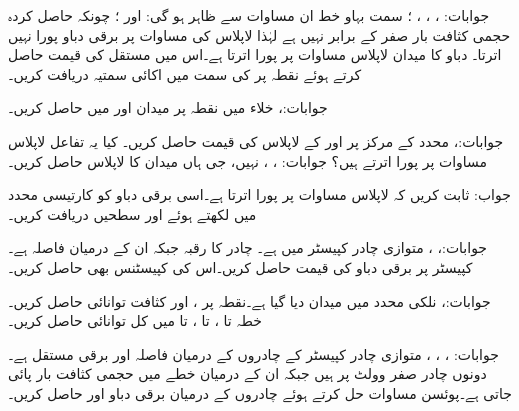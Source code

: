 جوابات: ، ،
 ، ؛ سمت بہاو خط ان مساوات سے ظاہر ہو گی:  اور ؛ چونکہ حاصل کردہ حجمی کثافت بار صفر کے برابر نہیں ہے لہٰذا لاپلاس کی مساوات پر برقی دباو پورا نہیں اترتا۔
دباو کا میدان  لاپلاس مساوات پر پورا اترتا ہے۔اس میں مستقل  کی قیمت حاصل کرتے ہوئے نقطہ  پر  کی سمت میں اکائی سمتیہ دریافت کریں۔

جوابات:، 
خلاء میں نقطہ  پر میدان  اور  میں  حاصل کریں۔

جوابات:، 
محدد کے مرکز  پر   اور  کے لاپلاس کی قیمت حاصل کریں۔ کیا یہ تفاعل لاپلاس مساوات پر پورا اترتے ہیں؟
جوابات: ، ، نہیں، جی ہاں
میدان  کا لاپلاس حاصل کریں۔

جواب: 
ثابت کریں کہ  لاپلاس مساوات پر پورا اترتا ہے۔اسی برقی دباو کو کارتیسی محدد میں لکھتے ہوئے  اور  سطحیں دریافت کریں۔

جوابات:، ، 
متوازی چادر کپیسٹر میں  ہے۔ چادر کا رقبہ  جبکہ ان کے درمیان فاصلہ  ہے۔کپیسٹر پر برقی دباو کی قیمت حاصل کریں۔اس کی کپیسٹنس بھی حاصل کریں۔

جوابات:، 
نلکی محدد میں میدان  دیا گیا ہے۔نقطہ  پر ،  اور کثافت توانائی حاصل کریں۔خطہ  تا ،  تا ،   تا  میں کل توانائی حاصل کریں۔

جوابات: ، ، ،
متوازی چادر کپیسٹر کے چادروں کے درمیان فاصلہ  اور برقی مستقل  ہے۔دونوں چادر صفر وولٹ پر ہیں جبکہ ان کے درمیان خطے  میں حجمی کثافت بار  پائی جاتی ہے۔پوئسن  مساوات حل کرتے ہوئے چادروں کے درمیان برقی دباو اور  حاصل کریں۔

